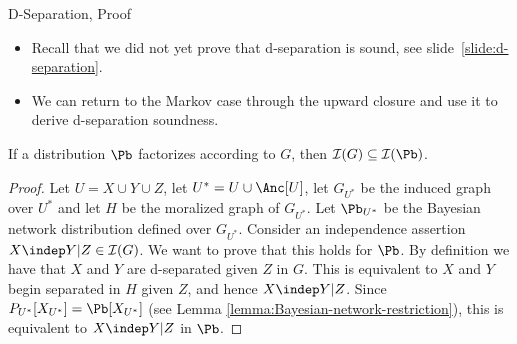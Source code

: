 \begin{frame}{D-Separation, Proof}
    \begin{itemize}
        \item Recall that we did not yet prove that d-separation is sound, see slide~\ref{slide:d-separation}.
        \pause
        \item We can return to the Markov case through the upward closure and use it to derive d-separation soundness.
    \end{itemize}
    \pause 
    \begin{theorem}
    If a distribution $\Pb$ factorizes according to $G$, then $\mathcal{I}(G) \subseteq \mathcal{I}(\Pb)$.
    \end{theorem}
    \begin{proof}
        Let $U = X \cup Y \cup Z$, let $U^* = U \cup \Anc[U]$, let $G_{U^*}$ be the induced graph over $U^*$ and let $H$ be the moralized graph of $G_{U^*}$.
        \pause
        Let $\Pb_{U^*}$ be the Bayesian network distribution defined over $G_{U^*}$.
        \pause
        Consider an independence assertion $X \indep Y | Z \in \mathcal{I}(G)$.
        We want to prove that this holds for $\Pb$.
        \pause
        By definition we have that $X$ and $Y$ are d-separated given $Z$ in $G$.
        This is equivalent to $X$ and $Y$ begin separated in $H$ given $Z$, and hence $X \indep Y | Z$.
        \pause 
        Since $P_{U^*}[X_{U^*}] =\Pb[X_{U^*}]$ (see Lemma \ref{lemma:Bayesian-network-restriction}), this is equivalent to $X \indep Y | Z$ in $\Pb$.
    \end{proof}
\end{frame}

